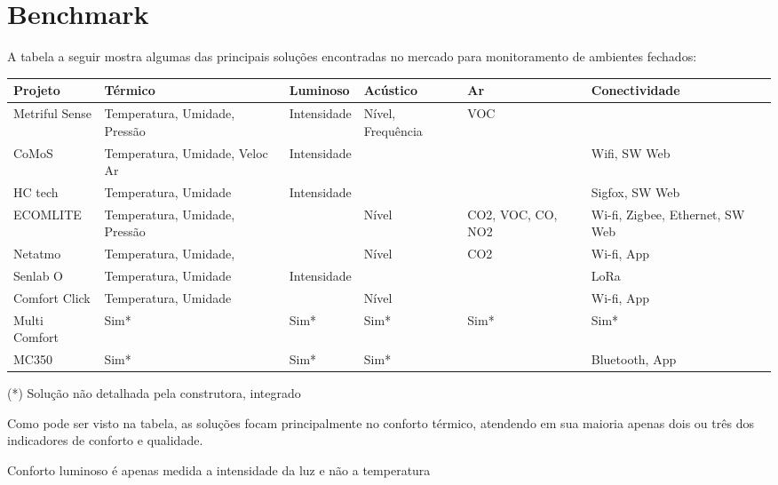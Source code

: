 \documentclass[]{politex}
\begin{document}
\chapter{Benchmark} %

A tabela a seguir mostra algumas das principais soluções encontradas no mercado para monitoramento de ambientes fechados: 

\begin{center}
\begin{tabular}{ | m{2.5cm} | m{2.4cm}| m{2.2cm} |m{2cm} |m{2.2cm} |m{2.5cm} | } 
\hline
Projeto & Térmico & Luminoso & Acústico & Ar & Conectividade \\ 
\hline
Metriful Sense\cite{metriful} & Temperatura, Umidade, Pressão & Intensidade & Nível, Frequência & VOC &  \\ \hline
CoMoS\cite{CoMoS} & Temperatura, Umidade, Veloc Ar & Intensidade & & & Wifi, SW Web \\ \hline
HC tech\cite{HCTech} & Temperatura, Umidade & Intensidade & & & Sigfox, SW Web \\ \hline
ECOMLITE\cite{ECOMLITE} & Temperatura, Umidade, Pressão & & Nível & CO2, VOC, CO, NO2 & Wi-fi, Zigbee, Ethernet, SW Web \\ \hline
Netatmo\cite{netatmo} & Temperatura, Umidade, & & Nível & CO2 & Wi-fi, App \\ \hline
Senlab O\cite{Senlab} & Temperatura, Umidade & Intensidade & & & LoRa \\ \hline
Comfort Click\cite{comfortclick} & Temperatura, Umidade & & Nível & & Wi-fi, App  \\ \hline
Multi Comfort\cite{multicomfort} & Sim* & Sim* & Sim* & Sim* & Sim* \\ \hline
MC350\cite{mc350} & Sim* & Sim* & Sim* & & Bluetooth, App \\
\hline
\end{tabular}
\end{center}

\begin{flushright}
(*) Solução não detalhada pela construtora, integrado
\end{flushright}


Como pode ser visto na tabela, as soluções focam principalmente no conforto térmico, atendendo em sua maioria apenas dois ou três dos indicadores de conforto e qualidade. 

Conforto luminoso é apenas medida a intensidade da luz e não a temperatura 
\end{document}
